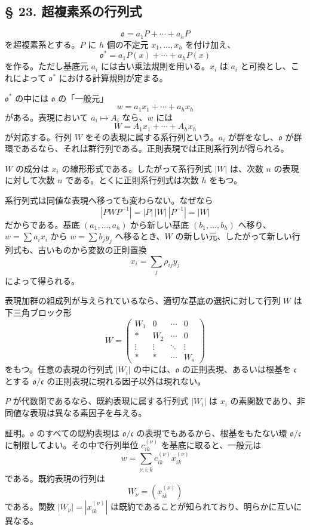 \documentclass[11pt]{article}
\providecommand{\mo}{\mathfrak{o}}
\providecommand{\mc}{\mathfrak{c}}
\begin{document}
\subsection*{§ 23. 超複素系の行列式}

\[
        \mo=a_1P+\cdots+a_hP
\]
を超複素系とする。$P$ に $h$ 個の不定元 $x_1,\ldots,x_h$ を付け加え、
\[
        \mo^*=a_1P(x)+\cdots+a_hP(x)
\]
を作る。ただし基底元 $a_i$ には古い乗法規則を用いる。$x_i$ は $a_i$ と可換とし、これによって $\mo^*$ における計算規則が定まる。

$\mo^*$ の中には $\mo$ の「一般元」
\[
        w=a_1x_1+\cdots+a_hx_h
\]
がある。表現において $a_i\mapsto A_i$ なら、$w$ には
\[
        W=A_1x_1+\cdots+A_hx_h
\]
が対応する。行列 $W$ をその表現に属する系行列という。$a_i$ が群をなし、$\mo$ が群環であるなら、それは群行列である。正則表現では正則系行列が得られる。

$W$ の成分は $x_i$ の線形形式である。したがって系行列式 $|W|$ は、次数 $n$ の表現に対して次数 $n$ である。とくに正則系行列式は次数 $h$ をもつ。

系行列式は同値な表現へ移っても変わらない。なぜなら
\[
        |PWP^{-1}|=|P|\,|W|\,|P^{-1}|=|W|
\]
だからである。基底 $(a_1,\ldots,a_h)$ から新しい基底 $(b_1,\ldots,b_h)$ へ移り、$w=\sum a_ix_i$ から $w=\sum b_jy_j$ へ移るとき、$W$ の新しい元、したがって新しい行列式も、古いものから変数の正則置換
\[
        x_i=\sum_j \rho_{ij}y_j
\]
によって得られる。

表現加群の組成列が与えられているなら、適切な基底の選択に対して行列 $W$ は下三角ブロック形
\[
        W=\begin{pmatrix}
        W_1&0&\cdots&0\\
        *&W_2&\cdots&0\\
        \vdots&\vdots&\ddots&\vdots\\
        *&*&\cdots&W_s
        \end{pmatrix}
\]
をもつ。任意の表現の行列式 $|W_i|$ の中には、$\mo$ の正則表現、あるいは根基を $\mc$ とする $\mo/\mc$ の正則表現に現れる因子以外は現れない。

$P$ が代数閉であるなら、既約表現に属する行列式 $|W_i|$ は $x_i$ の素関数であり、非同値な表現は異なる素因子を与える。

証明。$\mo$ のすべての既約表現は $\mo/\mc$ の表現でもあるから、根基をもたない環 $\mo/\mc$ に制限してよい。その中で行列単位 $c_{ik}^{(\nu)}$ を基底に取ると、一般元は
\[
        w=\sum_{\nu,i,k} c_{ik}^{(\nu)}x_{ik}^{(\nu)}
\]
である。既約表現の行列は
\[
        W_\nu=(x_{ik}^{(\nu)})
\]
である。関数 $|W_\nu|=|x_{ik}^{(\nu)}|$ は既約であることが知られており、明らかに互いに異なる。
\end{document}
